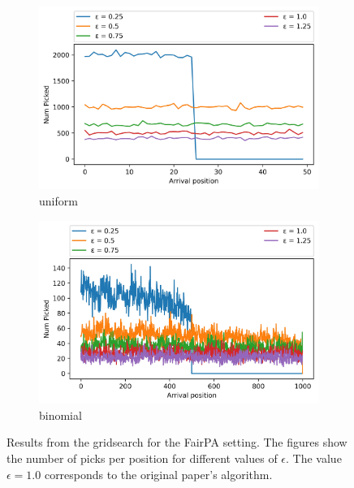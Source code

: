 \begin{figure}[h!]
  \begin{subfigure}[t]{.5\textwidth}
    \centering
    \includegraphics[width=\linewidth]{Images/extension/FairGeneralProphet_uniform.jpeg}
    \caption{uniform}
    \label{fig:extension_fairPA_uniform}
  \end{subfigure}
  \hfill
  \begin{subfigure}[t]{.5\textwidth}
    \centering
    \includegraphics[width=\linewidth]{Images/extension/FairGeneralProphet_binomial.jpeg}
    \caption{binomial}
    \label{fig:extension_fairPA_binomial}
  \end{subfigure}
  \caption{
    Results from the gridsearch for the FairPA setting. The figures show the number of picks per position for different values of $\epsilon$. The value $\epsilon = 1.0$ corresponds to the original paper's algorithm.
    }
    \label{fig:extension_fairPA}
\end{figure}

